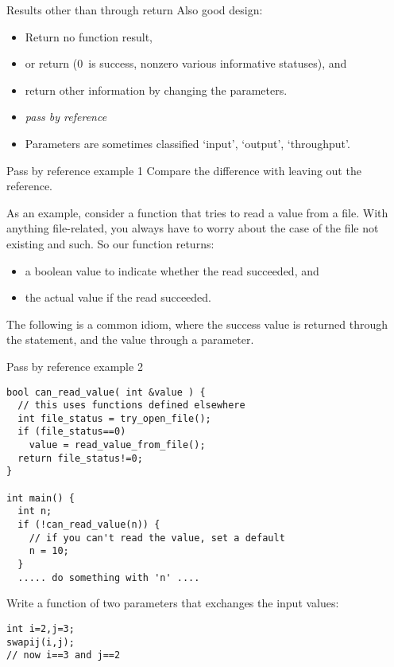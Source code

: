 \begin{slide}{Results other than through return}
  \label{sl:func-err-return}
  Also good design:
  \begin{itemize}
  \item Return no function result,
  \item or return  (0~is success, nonzero various
    informative statuses), and
  \item return other information by changing the parameters.
  \item \emph{pass by reference}
  \item Parameters are sometimes classified `input', `output', `throughput'.
  \end{itemize}
\end{slide}

\begin{block}{Pass by reference example 1}
  \label{sl:pass-reference1}
  Compare the difference with leaving out the reference.
\end{block}

As an example, consider a function that tries to read a value from a
file. With anything file-related, you always have to worry about the
case of the file not existing and such. So our function returns:
\begin{itemize}
\item a boolean value to indicate whether the read succeeded, and
\item the actual value if the read succeeded.
\end{itemize}
The following is a common idiom, where the success value is returned
through the  statement, and the value through a parameter.

\begin{block}{Pass by reference example 2}
  \label{sl:pass-reference2}
\begin{lstlisting}
bool can_read_value( int &value ) {
  // this uses functions defined elsewhere
  int file_status = try_open_file();
  if (file_status==0) 
    value = read_value_from_file();
  return file_status!=0;
}

int main() {
  int n;
  if (!can_read_value(n)) {
    // if you can't read the value, set a default
    n = 10;
  }
  ..... do something with 'n' ....
\end{lstlisting}
\end{block}

\begin{exercise}
  \label{ex:swap}
  Write a  function  of two parameters that
  exchanges the input values:
\begin{lstlisting}
int i=2,j=3;
swapij(i,j);
// now i==3 and j==2
\end{lstlisting}
\end{exercise}

